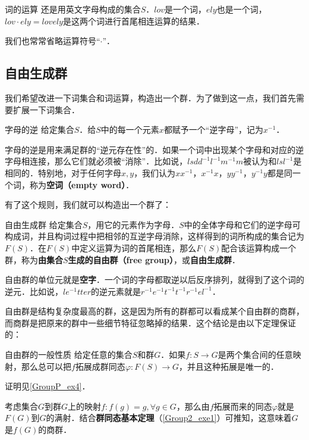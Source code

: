 \begin{example}{词的运算}
还是用英文字母构成的集合$S$．$lov$是一个词，$ely$也是一个词，$lov\cdot ely=lovely$是这两个词进行首尾相连运算的结果．
\end{example}

我们也常常省略运算符号“$\cdot$”．

\subsection{自由生成群}

我们希望改进一下词集合和词运算，构造出一个群．为了做到这一点，我们首先需要扩展一下词集合．

\begin{definition}{字母的逆}
给定集合$S$．给$S$中的每一个元素$x$都赋予一个“逆字母”，记为$x^{-1}$．
\end{definition}

字母的逆是用来满足群的“逆元存在性”的．如果一个词中出现某个字母和对应的逆字母相连接，那么它们就必须被“消除”．比如说，$lsdd^{-1}l^{-1}m^{-1}m$被认为和$lsl^{-1}$是相同的．特别地，对于任何字母$x, y$，我们认为$xx^{-1}$，$x^{-1}x$，$yy^{-1}$，$y^{-1}y$都是同一个词，称为\textbf{空词（empty word）}．

有了这个规则，我们就可以构造出一个群了：

\begin{theorem}{自由生成群}
给定集合$S$，用它的元素作为字母．$S$中的全体字母和它们的逆字母可构成词，并且构词过程中把相邻的互逆字母消除，这样得到的词所构成的集合记为$F(S)$．在$F(S)$中定义运算为词的首尾相连，那么$F(S)$配合该运算构成一个群，称为\textbf{由集合$S$生成的自由群（free group）}，或\textbf{自由生成群}．
\end{theorem}

自由群的单位元就是\textbf{空字}．一个词的字母都取逆以后反序排列，就得到了这个词的逆元．比如说，$le^{-1}tter$的逆元素就是$r^{-1}e^{-1}t^{-1}t^{-1}r^{-1}el^{-1}$．

自由群是结构复杂度最高的群，这是因为所有的群都可以看成某个自由群的商群，而商群是把原来的群中一些细节特征忽略掉的结果．这个结论是由以下定理保证的：

\begin{theorem}{自由群的一般性质}\label{FreGrp_the1}
给定任意的集合$S$和群$G$．如果$f:S\rightarrow G$是两个集合间的任意映射，那么总可以把$f$拓展成群同态$\varphi:F(S)\rightarrow G$，并且这种拓展是唯一的．
\end{theorem}

证明见\autoref{GroupP_ex4}．

考虑集合$G$到群$G$上的映射$f:f(g)=g, \forall g\in G$，那么由$f$拓展而来的同态$\varphi$就是$F(G)$到$G$的满射．结合\textbf{群同态基本定理}（\autoref{Group2_exe1}）可推知，这意味着$G$是$f(G)$的商群．

